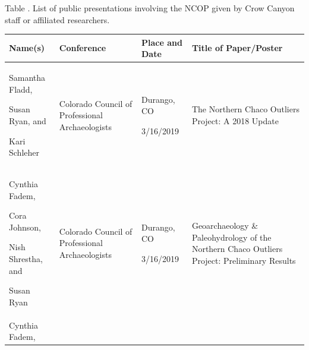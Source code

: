 \documentclass[
  12pt,
]{krantz}
\begin{document}
Table . List of public presentations involving the NCOP given by Crow Canyon staff or affiliated researchers.

\begin{longtable}[]{@{}llll@{}}
\toprule
\begin{minipage}[b]{0.21\columnwidth}\raggedright
Name(s)\strut
\end{minipage} & \begin{minipage}[b]{0.21\columnwidth}\raggedright
Conference\strut
\end{minipage} & \begin{minipage}[b]{0.21\columnwidth}\raggedright
Place and Date\strut
\end{minipage} & \begin{minipage}[b]{0.21\columnwidth}\raggedright
Title of
Paper/Poster\strut
\end{minipage}\tabularnewline
\midrule
\endhead
\begin{minipage}[t]{0.21\columnwidth}\raggedright
Samantha
Fladd,

Susan Ryan,
and

Kari Schleher\strut
\end{minipage} & \begin{minipage}[t]{0.21\columnwidth}\raggedright
Colorado
Council of
Professional
Archaeologists\strut
\end{minipage} & \begin{minipage}[t]{0.21\columnwidth}\raggedright
Durango, CO

3/16/2019\strut
\end{minipage} & \begin{minipage}[t]{0.21\columnwidth}\raggedright
The Northern
Chaco Outliers
Project: A
2018 Update\strut
\end{minipage}\tabularnewline
\begin{minipage}[t]{0.21\columnwidth}\raggedright
Cynthia Fadem,

Cora Johnson,

Nish Shrestha,
and

Susan Ryan\strut
\end{minipage} & \begin{minipage}[t]{0.21\columnwidth}\raggedright
Colorado
Council of
Professional
Archaeologists\strut
\end{minipage} & \begin{minipage}[t]{0.21\columnwidth}\raggedright
Durango, CO

3/16/2019\strut
\end{minipage} & \begin{minipage}[t]{0.21\columnwidth}\raggedright
Geoarchaeology
\&
Paleohydrology
of the
Northern Chaco
Outliers
Project:
Preliminary
Results\strut
\end{minipage}\tabularnewline
\begin{minipage}[t]{0.21\columnwidth}\raggedright
Cynthia Fadem,


\end{minipage}
\end{longtable}
\end{document}

